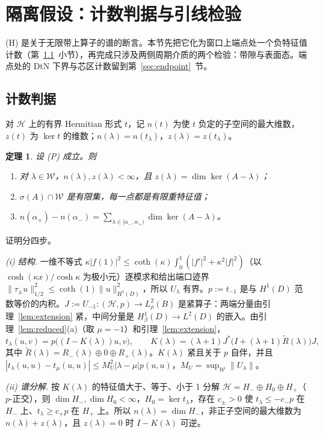 \documentclass[11pt,a4paper,fontset=fandol]{ctexart}
\theoremstyle{plain}
\newtheorem{theorem}{定理}[section]
\theoremstyle{definition}
\theoremstyle{remark}
\begin{document}
\section{隔离假设：计数判据与引线检验}
\label{sec:H}
(H) 是关于无限带上算子的谱的断言。本节先把它化为窗口上端点处一个负特征值计数（第~\ref{sec:count-crit}~小节），再完成只涉及两侧周期介质的两个检验：带隙与表面态。端点处的 DtN 下界与芯区计数留到第~\ref{sec:endpoint}~节。

\subsection{计数判据}
\label{sec:count-crit}
对 $\mathcal H$ 上的有界 Hermitian 形式 $t$，记 $n(t)$ 为使 $t$ 负定的子空间的最大维数，$z(t)$ 为 $\ker t$ 的维数；$n(\lambda)=n(t_\lambda)$，$z(\lambda)=z(t_\lambda)$。

\begin{theorem}
\label{thm:count}
设 (P) 成立。则
\begin{enumerate}
\item 对 $\lambda\in\mathcal W$，$n(\lambda),z(\lambda)<\infty$，且 $z(\lambda)=\dim\ker(A-\lambda)$；
\item $\sigma(A)\cap\mathcal W$ 是有限集，每一点都是有限重特征值；
\item $n(\alpha_+)-n(\alpha_-)=\sum_{\lambda\in[\alpha_-,\alpha_+)}\dim\ker(A-\lambda)$。
\end{enumerate}
\end{theorem}

证明分四步。

\emph{(i) 结构.} 一维不等式 $\kappa|f(1)|^2\le\coth(\kappa)\int_0^1(|f'|^2+\kappa^2|f|^2)$（以 $\cosh(\kappa x)/\cosh\kappa$ 为极小元）逐模求和给出端口迹界 $\|\tau_\pm u\|_{1/2}^2\le\coth(1)\|u\|_{H^1(D)}^2$，所以 $U_\lambda$ 有界。$p:=t_{-1}$ 是与 $H^1(D)$ 范数等价的内积。$J:=U_{-1}:(\mathcal H,p)\to L^2_\rho(B)$ 是紧算子：两端分量由引理~\ref{lem:extension} 紧，中间分量是 $H^1_\beta(D)\to L^2(D)$ 的嵌入。由引理~\ref{lem:reduced}(a)（取 $\mu=-1$）和引理~\ref{lem:extension}，
\[
t_\lambda(u,v)=p\bigl((I-K(\lambda))u,v\bigr),\qquad K(\lambda)=(\lambda+1)J^*\bigl(I+(\lambda+1)\tilde R(\lambda)\bigr)J,
\]
其中 $\tilde R(\lambda)=R_-(\lambda)\oplus0\oplus R_+(\lambda)$。$K(\lambda)$ 紧且关于 $p$ 自伴，并且 $|t_\lambda(u,u)-t_\mu(u,u)|\le M_U^2|\lambda-\mu|p(u,u)$，$M_U=\sup_{\mathcal W}\|U_\lambda\|$。

\emph{(ii) 谱分解.} 按 $K(\lambda)$ 的特征值大于、等于、小于 1 分解 $\mathcal H=H_-\oplus H_0\oplus H_+$（$p$-正交），则 $\dim H_-,\dim H_0<\infty$，$H_0=\ker t_\lambda$，存在 $c_\pm>0$ 使 $t_\lambda\le-c_-p$ 在 $H_-$ 上、$t_\lambda\ge c_+p$ 在 $H_+$ 上。所以 $n(\lambda)=\dim H_-$，非正子空间的最大维数为 $n(\lambda)+z(\lambda)$，且 $z(\lambda)=0$ 时 $I-K(\lambda)$ 可逆。
\end{document}
